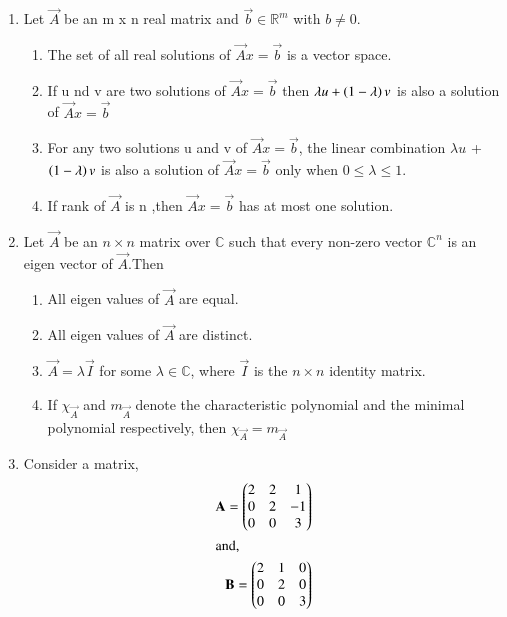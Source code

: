 \begin{enumerate}[label=\thesection.\arabic*.,ref=\thesection.\theenumi]
%
%
\solution

\item  Let $\vec{A}$ be an m x n real matrix and $\vec{b}\in \mathbb{R}^m$ with $b\neq 0$.
\begin{enumerate}
    \item The set of all real solutions of $\vec{A}x=\vec{b}$ is a vector space.\\
    \item If u nd v are two solutions of $\vec{A}x=\vec{b}$ then $\lambda u  +\left(1-\lambda\right)v$ is also a solution of $\vec{A}x=\vec{b}$\\
    \item For any two solutions u and v of $\vec{A}x=\vec{b}$, the linear combination $\lambda u$ + $\left(1-\lambda\right)v$ is also a solution of $\vec{A}x=\vec{b}$ only when $0\leq\lambda\leq1.$\\
    \item If rank of $\vec{A}$ is n ,then $\vec{A}x=\vec{b}$ has at most one solution.\ 
    \end{enumerate}
%
\solution

\item Let $\vec{A}$ be an $n\times n$ matrix over $\mathbb{C}$ such that every non-zero vector $\mathbb{C}^n$ is an eigen vector of $\vec{A}$.Then
\begin{enumerate}
    \item All eigen values of $\vec{A}$ are equal.
    \item All eigen values of $\vec{A}$ are distinct.
    \item $\vec{A}=\lambda\vec{I}$ for some $\lambda \in \mathbb{C}$, where $\vec{I}$ is the $n\times n$ identity matrix.
    \item If $\chi_\vec{A}$ and $m_\vec{A}$ denote the characteristic polynomial and the minimal polynomial respectively, then $\chi_\vec{A}=m_\vec{A}$
\end{enumerate}
%

\solution

\item 	Consider a matrix,
	\begin{align}
	\mathbf{A} = \begin{pmatrix}2 & 2 & 1 \\0 & 2 & -1 \\ 0 & 0 & 3\end{pmatrix}\\ \intertext{and,} \mathbf{B} = \begin{pmatrix}2 & 1 & 0 \\ 0 & 2 & 0 \\ 0 & 0 & 3\end{pmatrix}
	\end{align}
	

\end{enumerate}
